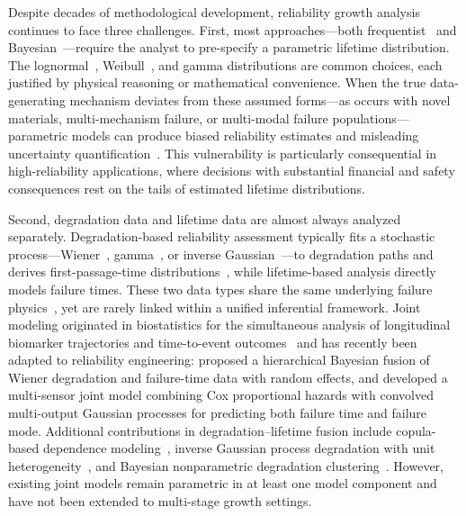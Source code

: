 \documentclass[a4paper,fleqn,longmktitle]{cas-sc}
\begin{document}
Despite decades of methodological development, reliability growth analysis continues to face three challenges. First, most approaches---both frequentist~\cite{Crow1984,Fries1993,Donovan2025} and Bayesian~\cite{Guida2001,Wayne2006,Gholami2022}---require the analyst to pre-specify a parametric lifetime distribution. The lognormal~\cite{Liu2026a}, Weibull~\cite{Gholami2022}, and gamma distributions are common choices, each justified by physical reasoning or mathematical convenience. When the true data-generating mechanism deviates from these assumed forms---as occurs with novel materials, multi-mechanism failure, or multi-modal failure populations---parametric models can produce biased reliability estimates and misleading uncertainty quantification~\cite{Muller2004,Gelman2013}. This vulnerability is particularly consequential in high-reliability applications, where decisions with substantial financial and safety consequences rest on the tails of estimated lifetime distributions.

Second, degradation data and lifetime data are almost always analyzed separately. Degradation-based reliability assessment typically fits a stochastic process---Wiener~\cite{Hao2023,Kang2023}, gamma~\cite{Giorgio2024}, or inverse Gaussian~\cite{Fan2024,Zheng2024b}---to degradation paths and derives first-passage-time distributions~\cite{Si2014,Zhang2018}, while lifetime-based analysis directly models failure times. These two data types share the same underlying failure physics~\cite{Meeker1998}, yet are rarely linked within a unified inferential framework. Joint modeling originated in biostatistics for the simultaneous analysis of longitudinal biomarker trajectories and time-to-event outcomes~\cite{Tsiatis2004,Rizopoulos2012,Wulfsohn1997,Henderson2000} and has recently been adapted to reliability engineering: \cite{Fu2024} proposed a hierarchical Bayesian fusion of Wiener degradation and failure-time data with random effects, and \cite{Fard2025} developed a multi-sensor joint model combining Cox proportional hazards with convolved multi-output Gaussian processes for predicting both failure time and failure mode. Additional contributions in degradation--lifetime fusion include copula-based dependence modeling~\cite{Hao2024}, inverse Gaussian process degradation with unit heterogeneity~\cite{Zheng2024b,Fan2024}, and Bayesian nonparametric degradation clustering~\cite{Nguyen2023}. However, existing joint models remain parametric in at least one model component and have not been extended to multi-stage growth settings.
\end{document}
